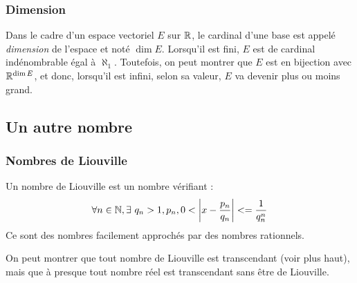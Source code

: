 \documentclass{beamercours}
\begin{document}
\begin{frame}
    \frametitle{Dimension}
    Dans le cadre d'un espace vectoriel $E$ sur $\mathbb{R}$, le cardinal d'une base est appelé \emph{dimension} de l'espace et noté $\dim E$. Lorsqu'il est fini, $E$ est de cardinal indénombrable égal à $\aleph_{1}$. Toutefois, on peut montrer que $E$ est en bijection avec $\mathbb{R}^{\dim E}$, et donc, lorsqu'il est infini, selon sa valeur, $E$ va devenir plus ou moins grand.




\end{frame}

\subsection{Un autre nombre}

\begin{frame}
    \frametitle{Nombres de Liouville}
    Un nombre de Liouville est un nombre vérifiant : 
    \[
        \forall n \in \mathbb{N}, \exists\ q_{n} > 1, p_{n}, 0 < \left|x - \frac{p_{n}}{q_{n}}\right| <= \frac{1}{q_{n}^{n}}
    \]
    Ce sont des nombres facilement approchés par des nombres rationnels.

    On peut montrer que tout nombre de Liouville est transcendant (voir plus haut), mais que à presque tout nombre réel est transcendant sans être de Liouville.
\end{frame}
\end{document}
